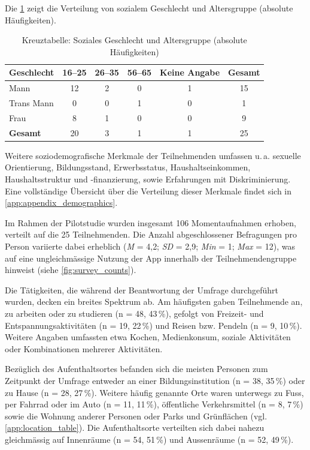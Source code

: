 Die \cref{tab:kreuztabelle_abs} zeigt die Verteilung von sozialem Geschlecht und Altersgruppe (absolute Häufigkeiten).

\begin{table}[H]
    \centering
    \caption{Kreuztabelle: Soziales Geschlecht und Altersgruppe (absolute Häufigkeiten)}
    \label{tab:kreuztabelle_abs}
    \begin{tabular}{lccccc}
    \toprule
    \textbf{Geschlecht} & 16--25 & 26--35 & 56--65 & Keine Angabe & Gesamt \\
    \midrule
    Mann       & 12 & 2 & 0 & 1 & 15 \\
    Trans Mann &  0 & 0 & 1 & 0 & 1  \\
    Frau       &  8 & 1 & 0 & 0 & 9  \\
    \midrule
    \textbf{Gesamt} & 20 & 3 & 1 & 1 & 25 \\
    \bottomrule
    \end{tabular}
\end{table}

Weitere soziodemografische Merkmale der Teilnehmenden umfassen u.\,a. sexuelle Orientierung, Bildungsstand, Erwerbsstatus, Haushaltseinkommen, Haushaltsstruktur und -finanzierung, sowie Erfahrungen mit Diskriminierung. Eine vollständige Übersicht über die Verteilung dieser Merkmale findet sich in \cref{app:appendix_demographics}.


Im Rahmen der Pilotstudie wurden insgesamt 106 Momentaufnahmen erhoben, verteilt auf die 25 Teilnehmenden. Die Anzahl abgeschlossener Befragungen pro Person variierte dabei erheblich (\textit{M} = 4{,}2; \textit{SD} = 2{,}9; \textit{Min} = 1; \textit{Max} = 12), was auf eine ungleichmässige Nutzung der App innerhalb der Teilnehmendengruppe hinweist (siehe \cref{fig:survey_counts}).

Die Tätigkeiten, die während der Beantwortung der Umfrage durchgeführt wurden, decken ein breites Spektrum ab. Am häufigsten gaben Teilnehmende an, zu arbeiten oder zu studieren (n = 48, 43\,\%), gefolgt von Freizeit- und Entspannungsaktivitäten (n = 19, 22\,\%) und Reisen bzw. Pendeln (n = 9, 10\,\%). Weitere Angaben umfassten etwa Kochen, Medienkonsum, soziale Aktivitäten oder Kombinationen mehrerer Aktivitäten.

Bezüglich des Aufenthaltsortes befanden sich die meisten Personen zum Zeitpunkt der Umfrage entweder an einer Bildungsinstitution (n = 38, 35\,\%) oder zu Hause (n = 28, 27\,\%). Weitere häufig genannte Orte waren unterwegs zu Fuss, per Fahrrad oder im Auto (n = 11, 11\,\%), öffentliche Verkehrsmittel (n = 8, 7\,\%) sowie die Wohnung anderer Personen oder Parks und Grünflächen (vgl. \cref{app:location_table}). Die Aufenthaltsorte verteilten sich dabei nahezu gleichmässig auf Innenräume (n = 54, 51\,\%) und Aussenräume (n = 52, 49\,\%).

